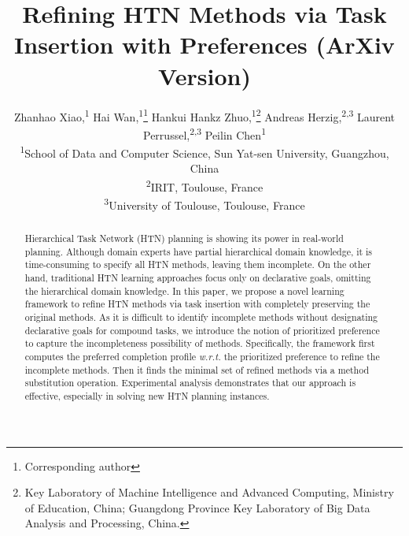 \documentclass[letterpaper]{article} %
\title{Refining HTN Methods via Task Insertion with Preferences (ArXiv Version)}
\author{Zhanhao Xiao,\textsuperscript{\rm 1} Hai Wan,\textsuperscript{\rm 1}\thanks{Corresponding author} Hankui Hankz Zhuo,\textsuperscript{\rm 1}\thanks{Key Laboratory of Machine Intelligence and Advanced Computing, Ministry of Education, China; Guangdong Province Key Laboratory of Big Data Analysis and Processing, China.} Andreas Herzig,\textsuperscript{\rm 2,3} Laurent Perrussel,\textsuperscript{\rm 2,3} Peilin Chen\textsuperscript{\rm 1}\\
\textsuperscript{\rm 1}School of Data and Computer Science, Sun Yat-sen University, Guangzhou, China\\
\textsuperscript{\rm 2}IRIT, Toulouse, France\\
\textsuperscript{\rm 3}University of Toulouse, Toulouse, France\\
%
}
\begin{document}
\maketitle
{}
\begin{abstract}
Hierarchical Task Network (HTN) planning is showing its power in real-world planning. Although domain experts have partial hierarchical domain knowledge, it is time-consuming to specify all HTN methods, leaving them incomplete. On the other hand, traditional HTN learning approaches focus only on declarative goals, omitting the hierarchical domain knowledge.
In this paper, we propose a novel learning framework to refine HTN methods via task insertion with completely preserving the original methods.
As it is difficult to identify incomplete methods without designating declarative goals for compound tasks, we introduce the notion of prioritized preference to capture the incompleteness possibility of methods.
Specifically, the framework first computes the preferred completion profile \emph{w.r.t.} the prioritized preference to refine the incomplete methods.
Then it finds the minimal set of refined methods via a method substitution operation.
Experimental analysis demonstrates that our approach is effective, especially in solving new HTN planning instances.
%
\end{abstract}
\end{document}
